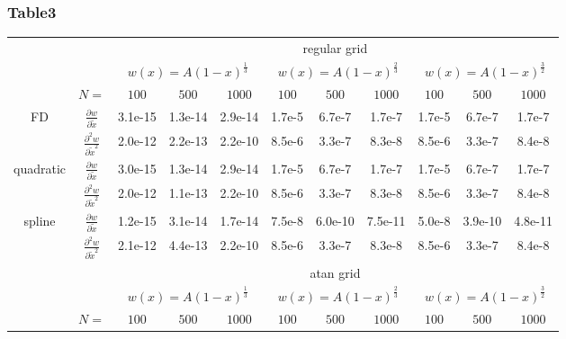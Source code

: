 \subsubsection{Table3}
\begin{tabular}{cc|c|c|c|c|c|c|c|c|c|}
\cline{3-11}
& & \multicolumn{9}{|c|}{regular grid}
\\ \cline{3-11}
& & \multicolumn{3}{|c|}{$w(x)=A(1-x)^\frac{1}{3}$} &  \multicolumn{3}{|c|}{$w(x)=A(1-x)^\frac{2}{3}$} &  \multicolumn{3}{|c|}{$w(x)=A(1-x)^\frac{3}{2}$}
\\ \cline{2-11}
& \multicolumn{1}{|c|}{$N=$} & $100$ & $500$ & $1000$ & $100$ & $500$ & $1000$ & $100$ & $500$ & $1000$
\\ \cline{1-11}
\multicolumn{1}{|c|}{\multirow{2}{*}{FD}} &
\multicolumn{1}{|c|}{$\frac{\partial w}{\partial \tilde x}$}
  &3.1e-15  &1.3e-14  &2.9e-14  &1.7e-5  &6.7e-7  &1.7e-7  &1.7e-5  &6.7e-7  &1.7e-7
\\ \cline{2-11}
\multicolumn{1}{|c|}{}                        &
\multicolumn{1}{|c|}{$\frac{\partial^2 w}{\partial \tilde x^2}$}
  &2.0e-12  &2.2e-13  &2.2e-10  &8.5e-6  &3.3e-7  &8.3e-8  &8.5e-6  &3.3e-7  &8.4e-8
\\ \cline{1-11}
\multicolumn{1}{|c|}{\multirow{2}{*}{quadratic}} &
\multicolumn{1}{|c|}{$\frac{\partial w}{\partial \tilde x}$}
  &3.0e-15  &1.3e-14  &2.9e-14  &1.7e-5  &6.7e-7  &1.7e-7  &1.7e-5  &6.7e-7  &1.7e-7
\\ \cline{2-11}
\multicolumn{1}{|c|}{}                        &
\multicolumn{1}{|c|}{$\frac{\partial^2 w}{\partial \tilde x^2}$}
  &2.0e-12  &1.1e-13  &2.2e-10  &8.5e-6  &3.3e-7  &8.3e-8  &8.5e-6  &3.3e-7  &8.4e-8
\\ \cline{1-11}
\multicolumn{1}{|c|}{\multirow{2}{*}{spline}} &
\multicolumn{1}{|c|}{$\frac{\partial w}{\partial \tilde x}$}
  &1.2e-15  &3.1e-14  &1.7e-14  &7.5e-8  &6.0e-10  &7.5e-11  &5.0e-8  &3.9e-10  &4.8e-11
\\ \cline{2-11}
\multicolumn{1}{|c|}{}                        &
\multicolumn{1}{|c|}{$\frac{\partial^2 w}{\partial \tilde x^2}$}
  &2.1e-12  &4.4e-13  &2.2e-10  &8.5e-6  &3.3e-7  &8.3e-8  &8.5e-6  &3.3e-7  &8.4e-8
\\ \cline{1-11}
& & \multicolumn{9}{|c|}{atan grid}
\\ \cline{3-11}
& & \multicolumn{3}{|c|}{$w(x)=A(1-x)^\frac{1}{3}$} &  \multicolumn{3}{|c|}{$w(x)=A(1-x)^\frac{2}{3}$} &  \multicolumn{3}{|c|}{$w(x)=A(1-x)^\frac{3}{2}$}
\\ \cline{2-11}
& \multicolumn{1}{|c|}{$N=$} & $100$ & $500$ & $1000$ & $100$ & $500$ & $1000$ & $100$ & $500$ & $1000$

\end{tabular}
